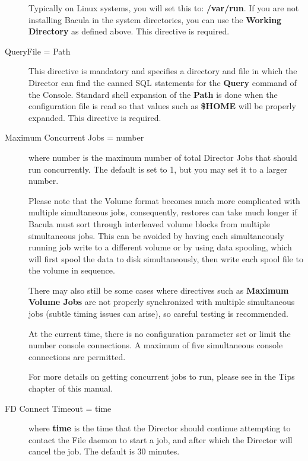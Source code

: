 \begin{description}
Typically on Linux systems, you will set this to:  {\bf /var/run}. If you are
not installing Bacula in the  system directories, you can use the {\bf Working
Directory} as  defined above.  This directive is required.  

\item [QueryFile = \lt{}Path\gt{}]
   This directive  is mandatory and specifies a directory and file in which the
Director  can find the canned SQL statements for the {\bf Query} command of 
the Console. Standard shell expansion of the {\bf Path} is done  when the
configuration file is read so that values such as  {\bf \$HOME} will be
properly expanded. This directive is required.  
\label{DirMaxConJobs}

\item [Maximum Concurrent Jobs = \lt{}number\gt{}]
   where \lt{}number\gt{}  is the maximum number of total Director Jobs that
should run  concurrently. The default is set to 1, but you may set it to a 
larger number.  

Please  note that the Volume format becomes much more complicated with 
multiple simultaneous jobs, consequently, restores can take much  longer if
Bacula must sort through interleaved volume blocks from  multiple simultaneous
jobs. This can be avoided by having each  simultaneously running job write to
a different volume or  by using data spooling, which will first spool the data
to disk simultaneously, then write each spool file to the  volume in
sequence.  

There may also still be some cases where directives such as  {\bf Maximum
Volume Jobs} are not properly synchronized with  multiple simultaneous jobs
(subtle timing issues can arise),  so careful testing is recommended. 

At the current time,  there is no configuration parameter set or limit the
number  console connections. A maximum of five simultaneous console 
connections are permitted.  

For more details on getting concurrent jobs to run, please  see 
 in the Tips chapter
of this manual.  

\item [FD Connect Timeout = \lt{}time\gt{}]
   where {\bf time}  is the time that the Director should continue attempting  to
contact the File daemon to start a job, and after which the  Director will
cancel the job. The default is 30 minutes. 


\end{description}
